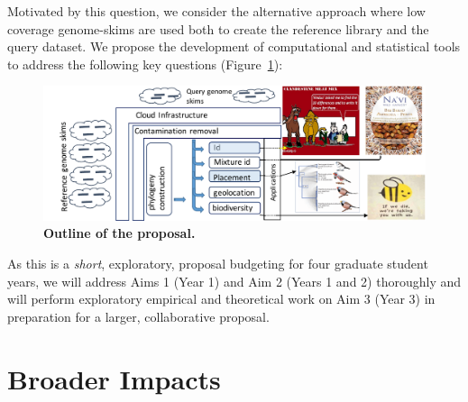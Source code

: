 Motivated by this question, we consider the alternative approach where
low coverage genome-skims are used both to create the reference
library and the query dataset. We propose the development of
computational and statistical tools to address the following key
questions (Figure~\ref{fig:overview}):
\begin{packed_desc}
\item [Aim 1:] 
\item [Aim 2:] 
\item [Aim 3:] 
\end{packed_desc}
\begin{figure}
\centering
  \includegraphics[width=1\textwidth]{fig/Outline.pdf}
\vspace{-20pt}\caption{{\bf Outline of the proposal.}}
  \label{fig:overview}
\end{figure}
As this is a \emph{short}, exploratory, proposal budgeting for four graduate student years, we will address Aims 1 (Year 1) and Aim 2 (Years 1 and 2) thoroughly and will perform exploratory empirical and theoretical work on Aim 3 (Year 3) in preparation for a larger, collaborative proposal.

\section{Broader Impacts}

